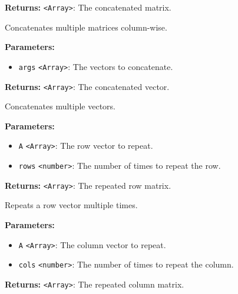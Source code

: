 \documentclass[12pt,a4paper]{article}
\begin{document}
\noindent \textbf{Returns:} \texttt{<Array>}: The concatenated matrix.

\noindent Concatenates multiple matrices column-wise.

\vspace{5mm}
\noindent {}


\noindent \textbf{Parameters:}
\begin{itemize}
  \item \texttt{args} \texttt{<Array>}: The vectors to concatenate.
\end{itemize}

\noindent \textbf{Returns:} \texttt{<Array>}: The concatenated vector.

\noindent Concatenates multiple vectors.

\vspace{5mm}
\noindent {}


\noindent \textbf{Parameters:}
\begin{itemize}
  \item \texttt{A} \texttt{<Array>}: The row vector to repeat.
  \item \texttt{rows} \texttt{<number>}: The number of times to repeat the row.
\end{itemize}

\noindent \textbf{Returns:} \texttt{<Array>}: The repeated row matrix.

\noindent Repeats a row vector multiple times.

\vspace{5mm}
\noindent {}


\noindent \textbf{Parameters:}
\begin{itemize}
  \item \texttt{A} \texttt{<Array>}: The column vector to repeat.
  \item \texttt{cols} \texttt{<number>}: The number of times to repeat the column.
\end{itemize}

\noindent \textbf{Returns:} \texttt{<Array>}: The repeated column matrix.
\end{document}
